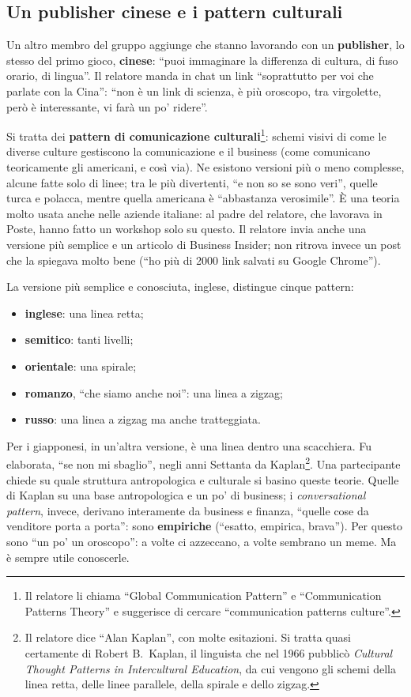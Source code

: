 \subsection{Un publisher cinese e i pattern culturali}

Un altro membro del gruppo aggiunge che stanno lavorando con un
\textbf{publisher}, lo stesso del primo gioco, \textbf{cinese}: ``puoi immaginare
la differenza di cultura, di fuso orario, di lingua''. Il relatore manda in chat un
link ``soprattutto per voi che parlate con la Cina'': ``non è un link di scienza,
è più oroscopo, tra virgolette, però è interessante, vi farà un po' ridere''.

Si tratta dei \textbf{pattern di comunicazione culturali}\footnote{Il relatore li
chiama ``Global Communication Pattern'' e ``Communication Patterns Theory'' e
suggerisce di cercare ``communication patterns culture''.}: schemi visivi di come
le diverse culture gestiscono la comunicazione e il business (come comunicano
teoricamente gli americani, e così via). Ne esistono versioni più o meno
complesse, alcune fatte solo di linee; tra le più divertenti, ``e non so se sono
veri'', quelle turca e polacca, mentre quella americana è ``abbastanza
verosimile''. È una teoria molto usata anche nelle aziende italiane: al padre del
relatore, che lavorava in Poste, hanno fatto un workshop solo su questo. Il
relatore invia anche una versione più semplice e un articolo di Business Insider;
non ritrova invece un post che la spiegava molto bene (``ho più di 2000 link
salvati su Google Chrome'').

La versione più semplice e conosciuta, inglese, distingue cinque pattern:
\begin{itemize}
  \item \textbf{inglese}: una linea retta;
  \item \textbf{semitico}: tanti livelli;
  \item \textbf{orientale}: una spirale;
  \item \textbf{romanzo}, ``che siamo anche noi'': una linea a zigzag;
  \item \textbf{russo}: una linea a zigzag ma anche tratteggiata.
\end{itemize}
Per i giapponesi, in un'altra versione, è una linea dentro una scacchiera. Fu
elaborata, ``se non mi sbaglio'', negli anni Settanta da
Kaplan\footnote{Il relatore dice ``Alan Kaplan'', con molte esitazioni. Si tratta
quasi certamente di Robert B.~Kaplan, il linguista che nel 1966 pubblicò
\emph{Cultural Thought Patterns in Intercultural Education}, da cui vengono gli
schemi della linea retta, delle linee parallele, della spirale e dello
zigzag.}. Una partecipante chiede su quale struttura antropologica e culturale si
basino queste teorie. Quelle di Kaplan su una base antropologica e un po' di
business; i \emph{conversational pattern}, invece, derivano interamente da
business e finanza, ``quelle cose da venditore porta a porta'': sono
\textbf{empiriche} (``esatto, empirica, brava''). Per questo sono ``un po' un
oroscopo'': a volte ci azzeccano, a volte sembrano un meme. Ma è sempre utile
conoscerle.

